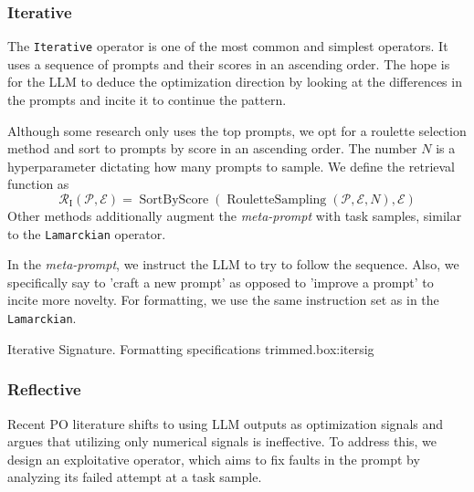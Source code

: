 \subsubsection{Iterative}
The \texttt{Iterative} operator is one of the most common and simplest operators. 
It uses a sequence of prompts and their scores in an ascending order.
The hope is for the LLM to deduce the optimization direction by looking at the differences in the prompts and incite it to continue the pattern.

Although some research\cite{yang2024largelanguagemodelsoptimizers} only uses the top prompts, we opt for a roulette selection method
and sort to prompts by score in an ascending order. The number $N$ is a hyperparameter dictating how many prompts to sample.
We define the retrieval function as
\begin{equation}
   \mathcal{R}_{\text{I}}(\mathcal{P}, \mathcal{E}) = \operatorname{SortByScore}(\operatorname{RouletteSampling}(\mathcal{P}, \mathcal{E}, N), \mathcal{E})
\end{equation}
Other methods\cite{tang2024unleashingpotentiallargelanguage} additionally augment the \textit{meta-prompt} with task samples, similar to the \texttt{Lamarckian} operator.

In the \textit{meta-prompt}, we instruct the LLM to try to follow the sequence. Also, we specifically say to 'craft a new prompt'
as opposed to 'improve a prompt' to incite more novelty. For formatting, we use the same instruction set as in the \texttt{Lamarckian}.
\begin{figurebox}{Iterative Signature. Formatting specifications trimmed.}{box:itersig}
\end{figurebox}

\subsubsection{Reflective}
Recent PO literature\cite{xiang2025selfsupervisedpromptoptimization} shifts to using LLM outputs as optimization signals
and argues that utilizing only numerical signals is ineffective. To address this, we design an exploitative operator, which
aims to fix faults in the prompt by analyzing its failed attempt at a task sample. 

